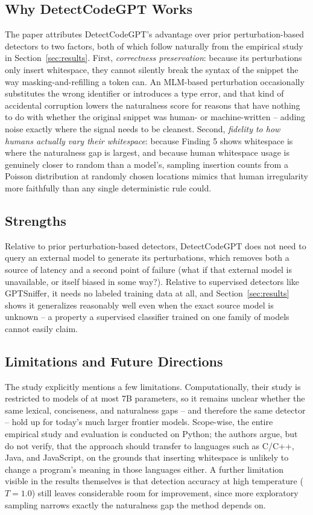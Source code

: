 \documentclass[manuscript,review]{acmart}
\begin{document}
\subsection{Why DetectCodeGPT Works}
The paper attributes DetectCodeGPT's advantage over prior perturbation-based detectors to two factors, both of which follow naturally from the empirical study in Section~\ref{sec:results}. First, \emph{correctness preservation}: because its perturbations only insert whitespace, they cannot silently break the syntax of the snippet the way masking-and-refilling a token can. An MLM-based perturbation occasionally substitutes the wrong identifier or introduces a type error, and that kind of accidental corruption lowers the naturalness score for reasons that have nothing to do with whether the original snippet was human- or machine-written -- adding noise exactly where the signal needs to be cleanest. Second, \emph{fidelity to how humans actually vary their whitespace}: because Finding 5 shows whitespace is where the naturalness gap is largest, and because human whitespace usage is genuinely closer to random than a model's, sampling insertion counts from a Poisson distribution at randomly chosen locations mimics that human irregularity more faithfully than any single deterministic rule could.

\subsection{Strengths}
Relative to prior perturbation-based detectors, DetectCodeGPT does not need to query an external model to generate its perturbations, which removes both a source of latency and a second point of failure (what if that external model is unavailable, or itself biased in some way?). Relative to supervised detectors like GPTSniffer, it needs no labeled training data at all, and Section~\ref{sec:results} shows it generalizes reasonably well even when the exact source model is unknown -- a property a supervised classifier trained on one family of models cannot easily claim.

\subsection{Limitations and Future Directions}
The study explicitly mentions a few limitations. Computationally, their study is restricted to models of at most 7B parameters, so it remains unclear whether the same lexical, conciseness, and naturalness gaps -- and therefore the same detector -- hold up for today's much larger frontier models. Scope-wise, the entire empirical study and evaluation is conducted on Python; the authors argue, but do not verify, that the approach should transfer to languages such as C/C++, Java, and JavaScript, on the grounds that inserting whitespace is unlikely to change a program's meaning in those languages either. A further limitation visible in the results themselves is that detection accuracy at high temperature ($T=1.0$) still leaves considerable room for improvement, since more exploratory sampling narrows exactly the naturalness gap the method depends on.
\end{document}
